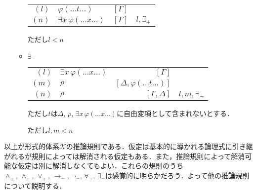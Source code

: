 \documentclass[10pt,b5paper,papersize,dvipdfmx]{jsbook}
\newcommand\ext[1]{\exists#1\,}
\begin{document}
\begin{itemize}
\begin{itemize}
      \begin{table}[H]
        \centering
        \begin{tabular}{rlrl}
          $(l)$&$\varphi(\dots t \dots)$&$[\Gamma]$& \\
          $(n)$&$\ext{x}\varphi(\dots x \dots)$&$[\Gamma]$&$l,\exists_+$
        \end{tabular}
      \end{table}
      ただし$l<n$
    \item $\exists_-$
      \begin{table}[H]
        \centering
        \begin{tabular}{rlrl}
          $(l)$&$\ext{x}\varphi(\dots x \dots)$&$[\Gamma]$& \\
          $(m)$&$\rho$&$[\Delta,\varphi(\dots t \dots)]$& \\
          $(n)$&$\rho$&$[\Gamma,\Delta]$&$l,m,\exists_-$
        \end{tabular}
      \end{table}
      ただし$t$は$\Delta,\, \rho,\, \ext{x}\varphi(\dots x \dots)$に自由変項として含まれないとする． \par
      ただし$l,m<n$
  \end{itemize}
\end{itemize}
以上が形式的体系$\mathcal K$の推論規則である．仮定は基本的に導かれる論理式に引き継がれるが規則によっては解消される仮定もある．また，推論規則によって解消可能な仮定は別に解消しなくてもよい．これらの規則のうち$\land_+,\, \land_-,\, \lor_+,\, \to_-,\, \lnot_-,\, \forall_-,\, \exists_+$は感覚的に明らかだろう．よって他の推論規則について説明する．
\end{document}
